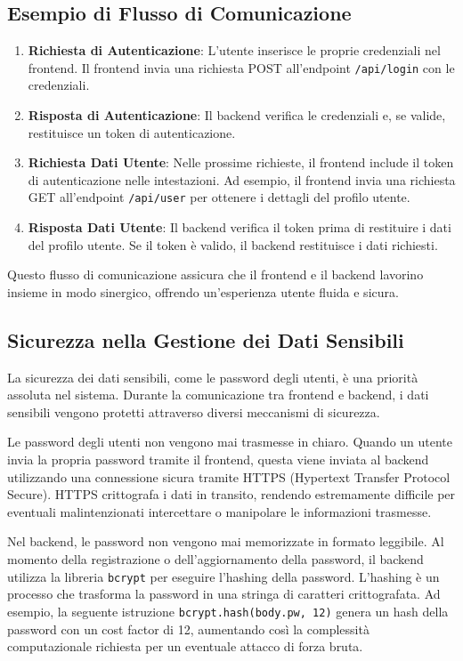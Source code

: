 \documentclass[twoside]{supsistudent}
\begin{document}
\subsection{Esempio di Flusso di Comunicazione}

\begin{enumerate}
  \item \textbf{Richiesta di Autenticazione}: L'utente inserisce le proprie credenziali nel frontend. Il frontend invia una richiesta POST all'endpoint \texttt{/api/login} con le credenziali.
  \item \textbf{Risposta di Autenticazione}: Il backend verifica le credenziali e, se valide, restituisce un token di autenticazione.
  \item \textbf{Richiesta Dati Utente}: Nelle prossime richieste, il frontend include il token di autenticazione nelle intestazioni. Ad esempio, il frontend invia una richiesta GET all'endpoint \texttt{/api/user} per ottenere i dettagli del profilo utente.
  \item \textbf{Risposta Dati Utente}: Il backend verifica il token prima di restituire i dati del profilo utente. Se il token è valido, il backend restituisce i dati richiesti.
\end{enumerate}

Questo flusso di comunicazione assicura che il frontend e il backend lavorino insieme in modo sinergico, offrendo un'esperienza utente fluida e sicura.

\subsection{Sicurezza nella Gestione dei Dati Sensibili}

La sicurezza dei dati sensibili, come le password degli utenti, è una priorità assoluta nel sistema. Durante la comunicazione tra frontend e backend, i dati sensibili vengono protetti attraverso diversi meccanismi di sicurezza.

Le password degli utenti non vengono mai trasmesse in chiaro. Quando un utente invia la propria password tramite il frontend, questa viene inviata al backend utilizzando una connessione sicura tramite HTTPS (Hypertext Transfer Protocol Secure). HTTPS crittografa i dati in transito, rendendo estremamente difficile per eventuali malintenzionati intercettare o manipolare le informazioni trasmesse.

Nel backend, le password non vengono mai memorizzate in formato leggibile. Al momento della registrazione o dell'aggiornamento della password, il backend utilizza la libreria \texttt{bcrypt} per eseguire l'hashing della password. L'hashing è un processo che trasforma la password in una stringa di caratteri crittografata. Ad esempio, la seguente istruzione \texttt{bcrypt.hash(body.pw, 12)} genera un hash della password con un cost factor di 12, aumentando così la complessità computazionale richiesta per un eventuale attacco di forza bruta.
\end{document}
